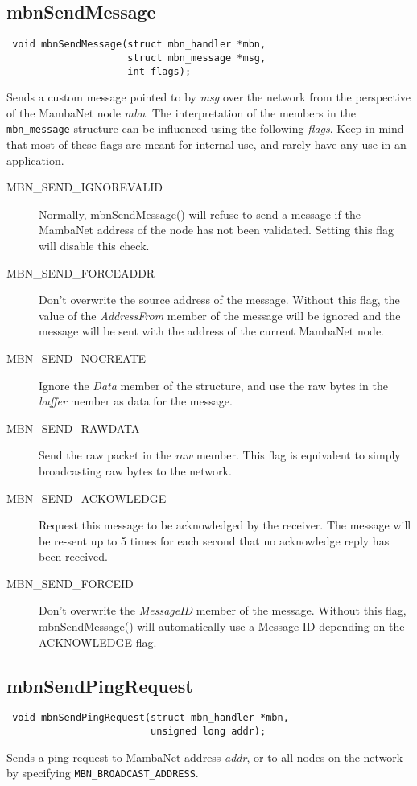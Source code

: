 \documentclass[a4paper]{report}
\begin{document}
\subsection{mbnSendMessage}
\begin{verbatim}
 void mbnSendMessage(struct mbn_handler *mbn,
                     struct mbn_message *msg,
                     int flags);
\end{verbatim}
Sends a custom message pointed to by \textit{msg} over the network from the perspective of the MambaNet node \textit{mbn}. The interpretation of the members in the \verb|mbn_message| structure can be influenced using the following \textit{flags}. Keep in mind that most of these flags are meant for internal use, and rarely have any use in an application.
\begin{description}
  \item[MBN\_SEND\_IGNOREVALID]
   Normally, mbnSendMessage() will refuse to send a message if the MambaNet address of the node has not been validated. Setting this flag will disable this check.
  \item[MBN\_SEND\_FORCEADDR]
   Don't overwrite the source address of the message. Without this flag, the value of the \textit{AddressFrom} member of the message will be ignored and the message will be sent with the address of the current MambaNet node.
  \item[MBN\_SEND\_NOCREATE]
   Ignore the \textit{Data} member of the structure, and use the raw bytes in the \textit{buffer} member as data for the message.
  \item[MBN\_SEND\_RAWDATA]
   Send the raw packet in the \textit{raw} member. This flag is equivalent to simply broadcasting raw bytes to the network.
  \item[MBN\_SEND\_ACKOWLEDGE]
   Request this message to be acknowledged by the receiver. The message will be re-sent up to 5 times for each second that no acknowledge reply has been received.
  \item[MBN\_SEND\_FORCEID]
   Don't overwrite the \textit{MessageID} member of the message. Without this flag, mbnSendMessage() will automatically use a Message ID depending on the ACKNOWLEDGE flag.
\end{description}


\subsection{mbnSendPingRequest}
\begin{verbatim}
 void mbnSendPingRequest(struct mbn_handler *mbn,
                         unsigned long addr);
\end{verbatim}
Sends a ping request to MambaNet address \textit{addr}, or to all nodes on the network by specifying \verb|MBN_BROADCAST_ADDRESS|.
\end{document}
